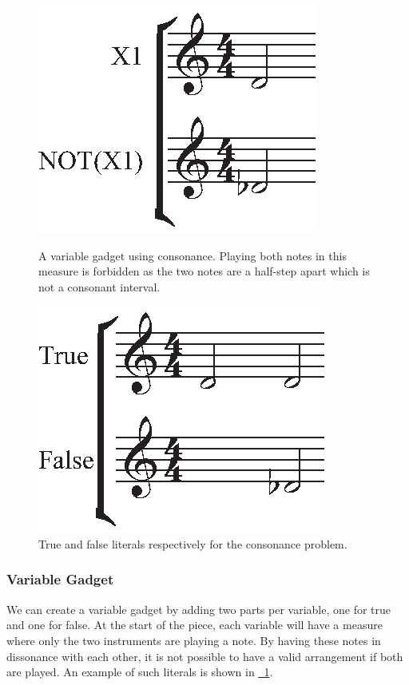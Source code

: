 \documentclass[11pt,letterpaper]{article}
\newcommand{\figref}[2][{}]{\hyperref[#2]{\figurename~\ref{#2}#1}}
\begin{document}
\begin{figure}[h!]
\centering
\begin{minipage}{.5\textwidth}
  \centering
  \includegraphics[width=0.55\linewidth]{untitled2.eps}
  \caption{A variable gadget using consonance. Playing both notes in this measure is forbidden as the two notes are a half-step apart which is not a consonant interval.}
  \label{var}
\end{minipage}%
\begin{minipage}{.5\textwidth}
  \centering
  \includegraphics[width=0.55\linewidth]{untitled.eps}
  \caption{True and false literals respectively for the consonance problem.}
  \label{true}
\end{minipage}
\end{figure}

\subsubsection{Variable Gadget}
We can create a variable gadget by adding two parts per variable, one for true and one for false. At the start of the piece, each variable will have a measure where only the two instruments are playing a note. By having these notes in dissonance with each other, it is not possible to have a valid arrangement if both are played. An example of such literals is shown in \figref{true}.
\end{document}
